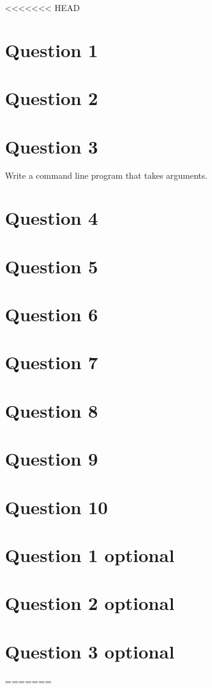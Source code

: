 \documentclass[12pt,letterpaper]{article}
\begin{document}
<<<<<<< HEAD
\section{Question 1}
\section{Question 2}
\section{Question 3}
Write a command line program that takes arguments.\\
\section{Question 4}
\section{Question 5}
\section{Question 6}
\section{Question 7}
\section{Question 8}
\section{Question 9}
\section{Question 10}
\section{Question 1 optional}
\section{Question 2 optional}
\section{Question 3 optional}
=======
\end{document}

